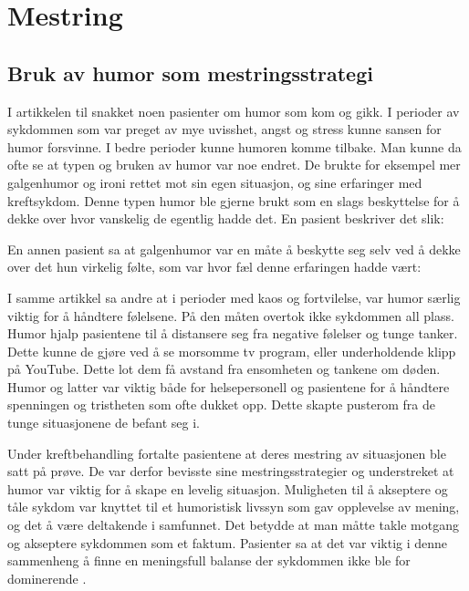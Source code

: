 \section{Mestring}

\subsection{Bruk av humor som mestringsstrategi}

I artikkelen til  snakket noen pasienter om humor som kom
og gikk. I perioder av sykdommen som var preget av mye uvisshet, angst og
stress kunne sansen for humor forsvinne. I bedre perioder kunne humoren komme
tilbake.  Man kunne da ofte se at typen og bruken av humor var noe endret. De
brukte for eksempel mer galgenhumor og ironi rettet mot sin egen situasjon, og
sine erfaringer med kreftsykdom. Denne typen humor ble gjerne brukt som en
slags beskyttelse for å dekke over hvor vanskelig de egentlig hadde det. En
pasient beskriver det slik: 

En annen pasient sa at galgenhumor var en måte å beskytte seg selv ved å dekke
over det hun virkelig følte, som var hvor fæl denne erfaringen hadde vært:

I samme artikkel sa andre at i perioder med kaos og fortvilelse, var humor
særlig viktig for å håndtere følelsene. På den måten overtok ikke sykdommen all
plass. Humor hjalp pasientene til å distansere seg fra negative følelser og
tunge tanker. Dette kunne de gjøre ved å se morsomme tv program, eller
underholdende klipp på YouTube. Dette lot dem få avstand fra ensomheten og
tankene om døden. Humor og latter var viktig både for helsepersonell og
pasientene for å håndtere spenningen og tristheten som ofte dukket opp. Dette
skapte pusterom fra de tunge situasjonene de befant seg i.

Under kreftbehandling fortalte pasientene at deres mestring av situasjonen ble
satt på prøve. De var derfor bevisste sine mestringsstrategier og understreket
at humor var viktig for å skape en levelig situasjon. Muligheten til å
akseptere og tåle sykdom var knyttet til et humoristisk livssyn som gav
opplevelse av mening, og det å være deltakende i samfunnet. Det betydde at man
måtte takle motgang og akseptere sykdommen som et faktum. Pasienter sa at det
var viktig i denne sammenheng å finne en meningsfull balanse der sykdommen ikke
ble for dominerende \cite{roaldsen2015}.

